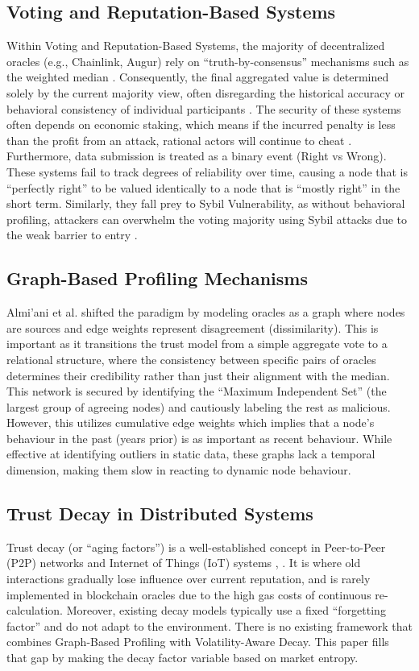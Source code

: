 \documentclass{ieeeaccess}
\begin{document}
\subsection{Voting and Reputation-Based Systems}
Within Voting and Reputation-Based Systems, the majority of decentralized oracles (e.g., Chainlink, Augur) rely on ``truth-by-consensus'' mechanisms such as the weighted median \cite{b9}. Consequently, the final aggregated value is determined solely by the current majority view, often disregarding the historical accuracy or behavioral consistency of individual participants \cite{b8}. The security of these systems often depends on economic staking, which means if the incurred penalty is less than the profit from an attack, rational actors will continue to cheat \cite{b6}. Furthermore, data submission is treated as a binary event (Right vs Wrong). These systems fail to track degrees of reliability over time, causing a node that is ``perfectly right'' to be valued identically to a node that is ``mostly right'' in the short term. Similarly, they fall prey to Sybil Vulnerability, as without behavioral profiling, attackers can overwhelm the voting majority using Sybil attacks due to the weak barrier to entry \cite{b10}.

\subsection{Graph-Based Profiling Mechanisms}
Almi'ani et al. \cite{b7} shifted the paradigm by modeling oracles as a graph where nodes are sources and edge weights represent disagreement (dissimilarity). This is important as it transitions the trust model from a simple aggregate vote to a relational structure, where the consistency between specific pairs of oracles determines their credibility rather than just their alignment with the median. This network is secured by identifying the ``Maximum Independent Set'' (the largest group of agreeing nodes) and cautiously labeling the rest as malicious. However, this utilizes cumulative edge weights which implies that a node's behaviour in the past (years prior) is as important as recent behaviour. While effective at identifying outliers in static data, these graphs lack a temporal dimension, making them slow in reacting to dynamic node behaviour.

\subsection{Trust Decay in Distributed Systems}
Trust decay (or ``aging factors'') is a well-established concept in Peer-to-Peer (P2P) networks and Internet of Things (IoT) systems \cite{b11}, \cite{b12}. It is where old interactions gradually lose influence over current reputation, and is rarely implemented in blockchain oracles due to the high gas costs of continuous re-calculation. Moreover, existing decay models typically use a fixed ``forgetting factor'' and do not adapt to the environment. There is no existing framework that combines Graph-Based Profiling with Volatility-Aware Decay. This paper fills that gap by making the decay factor variable based on market entropy.
\end{document}
